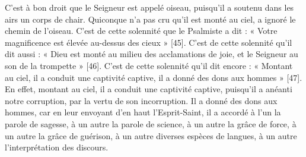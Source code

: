 C’est à bon droit que le Seigneur est appelé oiseau, puisqu’il a soutenu dans les airs un corps de chair. Quiconque n’a pas cru qu’il est monté au ciel, a ignoré le chemin de l’oiseau. C’est de cette solennité que le Psalmiste a dit : « Votre magnificence est élevée au-dessus des cieux » [45]. C’est de cette solennité qu’il dit aussi : « Dieu est monté au milieu des acclamations de joie, et le Seigneur au son de la trompette » [46]. C’est de cette solennité qu’il dit encore : « Montant au ciel, il a conduit une captivité captive, il a donné des dons aux hommes » [47]. En effet, montant au ciel, il a conduit une captivité captive, puisqu’il a anéanti notre corruption, par la vertu de son incorruption. Il a donné des dons aux hommes, car en leur envoyant d’en haut l’Esprit-Saint, il a accordé à l’un la parole de sagesse, à un autre la parole de science, à un autre la grâce de force, à un autre la grâce de guérison, à un autre diverses espèces de langues, à un autre l’interprétation des discours.